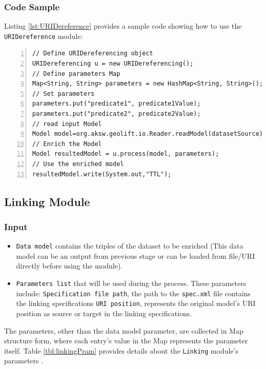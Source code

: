 \documentclass[a4paper,twoside,bibtotoc,abstracton,12pt,BCOR=15mm]{article}
\begin{document}
\subsubsection{Code Sample}
Listing \ref{lst:URIDereference} provides a sample code showing how to use the \texttt{URIDereference} module:

\begin{lstlisting}[label=lst:URIDereference, numbers=left, numberstyle=\tiny, caption = Code fragment to call the \texttt{URIDereferencing} class.]
// Define URIDereferencing object
URIDereferencing u = new URIDereferencing();
// Define parameters Map
Map<String, String> parameters = new HashMap<String, String>();
// Set parameters
parameters.put("predicate1", predicate1Value);
parameters.put("predicate2", predicate2Value);
// read input Model
Model model=org.aksw.geolift.io.Reader.readModel(datasetSource);
// Enrich the Model
Model resultedModel = u.process(model, parameters);
// Use the enriched model
resultedModel.write(System.out,"TTL");
\end{lstlisting}


\subsection{Linking Module}

\subsubsection{Input}
\begin{itemize}
 \item \texttt{Data model} contains the triples of the dataset to be enriched 
 (This data model can be an output from previous stage or can be loaded from file/URI directly before using the module). 
 \item \texttt{Parameters list} that will be used during the process. These parameters include:
 \subitem \texttt{Specification file path}, the path to the \texttt{spec.xml} file contains the linking specifications
 \subitem \texttt{URI position}, represents the original model's URI position as source or target in the linking specifications.
\end{itemize}
The parameters, other than the data model parameter, are  collected in Map structure form,
where each entry's value in the Map represents the parameter itself.
Table \ref{tbl:linkingPram} provides details about the \texttt{Linking} module's parameters .
\end{document}

